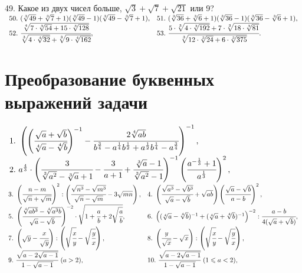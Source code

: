 \documentclass[12pt]{article}
\begin{document}
49. Какое из двух чисел больше, $\sqrt{3}+\sqrt{7}+\sqrt{21}$ или 9?\\
$\begin{array}{ll}
50.\ (\sqrt[3]{49}+\sqrt[3]{7}+1)(\sqrt[3]{49}-1)(\sqrt[3]{49}-\sqrt[3]{7}+1),&
51.\ (\sqrt[3]{36}+\sqrt[3]{6}+1)(\sqrt[3]{36}-1)(\sqrt[3]{36}-\sqrt[3]{6}+1),\\
52.\ \cfrac{\sqrt[4]{7\cdot\sqrt[3]{54}+15\cdot\sqrt[3]{128}}}{\sqrt[3]{4\cdot\sqrt[4]{32}}+\sqrt[3]{9\cdot\sqrt[4]{162}}},&
53.\ \cfrac{5\cdot\sqrt[3]{4\cdot\sqrt[3]{192}}+7\cdot\sqrt[3]{18\cdot\sqrt[3]{81}}}{\sqrt[3]{12\cdot
\sqrt[3]{24}+6\cdot\sqrt[3]{375}}}.
\end{array}$
\newpage
\section{Преобразование буквенных выражений задачи}
$\begin{array}{ll}
1.\ \left(\left(\cfrac{\sqrt{a}+\sqrt{b}}{\sqrt[4]{a}-\sqrt[4]{b}}\right)^{-1}-
\cfrac{2\sqrt[4]{ab}}{b^{\frac{3}{4}}-a^{\frac{1}{4}}b^{\frac{1}{2}}+
a^{\frac{1}{2}}b^{\frac{1}{4}}-a^{\frac{3}{4}}}\right)^{-1},\\
2.\ a^{\frac{4}{3}}\cdot\left(\cfrac{3}{\sqrt[3]{a^2}-\sqrt[3]{a}+1}-
\cfrac{3}{a+1}+\cfrac{\sqrt[3]{a}-1}{\sqrt[3]{a^2}-1}\right)^{-1}
\left(\cfrac{a^{-\frac{1}{3}}+1}{a^\frac{1}{3}}\right)^2,\\
\end{array}$\\
$\begin{array}{ll}
3.\ \left(\cfrac{n-m}{\sqrt{n}+\sqrt{m}}\right)^2:\left(\cfrac{\sqrt{n^3}-\sqrt{m^3}}{\sqrt{n}-\sqrt{m}}-
3\sqrt{mn}\right),&
4.\ \left(\cfrac{\sqrt{a^3}-\sqrt{b^3}}{\sqrt{a}-\sqrt{b}}+
\sqrt{ab}\right)\left(\cfrac{\sqrt{a}-\sqrt{b}}{a-b}\right)^2,\\
5.\ \left(\cfrac{\sqrt[4]{ab^3}-\sqrt[4]{a^3b}}{\sqrt{a}-\sqrt{b}}\right)^{-2}\cdot
\sqrt{1+\cfrac{a}{b}+2\sqrt{\cfrac{a}{b}}},&
6.\ \left((\sqrt[4]{a}-\sqrt[4]{b})^{-1}+(\sqrt[4]{a}+\sqrt[4]{b})^{-1}\right)^{-2}:
\cfrac{a-b}{4(\sqrt{a}+\sqrt{b})},\\
7.\ \left(\sqrt{y}-\cfrac{x}{\sqrt{y}}\right):\left(\sqrt{\cfrac{x}{y}}-
\sqrt{\cfrac{y}{x}}\right),&
8.\ \left(\cfrac{y}{\sqrt{x}}-\sqrt{x}\right):\left(\sqrt{\cfrac{x}{y}}-
\sqrt{\cfrac{y}{x}}\right),\\
9.\ \cfrac{\sqrt{a-2\sqrt{a-1}}}{1-\sqrt{a-1}}\ (a>2),&
10.\ \cfrac{\sqrt{a-2\sqrt{a-1}}}{1-\sqrt{a-1}}\ (1\leqslant a<2),\end{array}$ \\
\end{document}
